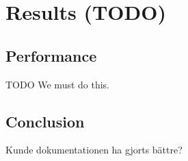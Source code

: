 \section{Results (TODO)}

\subsection{Performance}

TODO
We must do this.

\subsection{Conclusion}
Kunde dokumentationen ha gjorts bättre?

